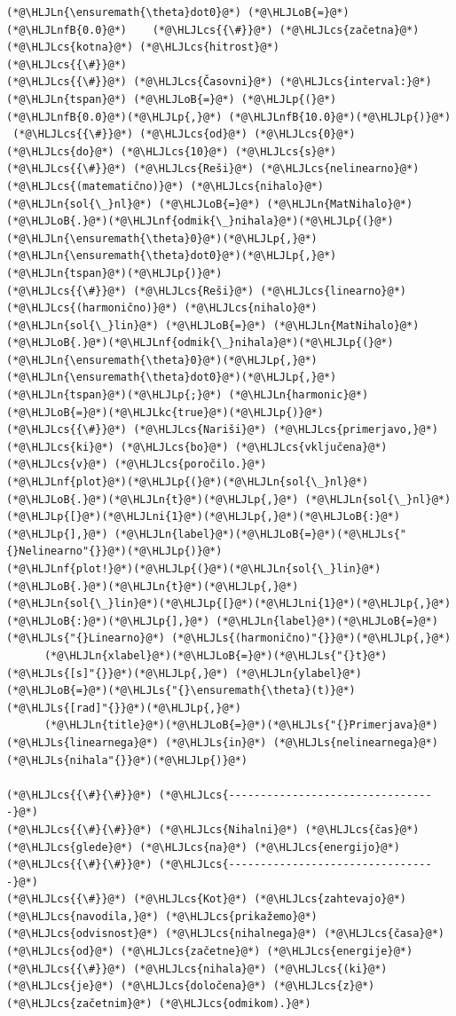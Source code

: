 \documentclass[12pt,a4paper]{article}
\newcommand{\HLJLkc}[1]{\textcolor[RGB]{59,151,46}{\textit{#1}}}
\newcommand{\HLJLn}[1]{#1}
\newcommand{\HLJLnf}[1]{\textcolor[RGB]{66,102,213}{#1}}
\newcommand{\HLJLs}[1]{\textcolor[RGB]{201,61,57}{#1}}
\newcommand{\HLJLnfB}[1]{\textcolor[RGB]{59,151,46}{#1}}
\newcommand{\HLJLni}[1]{\textcolor[RGB]{59,151,46}{#1}}
\newcommand{\HLJLoB}[1]{\textcolor[RGB]{102,102,102}{\textbf{#1}}}
\newcommand{\HLJLp}[1]{#1}
\newcommand{\HLJLcs}[1]{\textcolor[RGB]{153,153,119}{\textit{#1}}}
\begin{document}
\begin{lstlisting}
(*@\HLJLn{\ensuremath{\theta}dot0}@*) (*@\HLJLoB{=}@*) (*@\HLJLnfB{0.0}@*)    (*@\HLJLcs{{\#}}@*) (*@\HLJLcs{začetna}@*) (*@\HLJLcs{kotna}@*) (*@\HLJLcs{hitrost}@*)
(*@\HLJLcs{{\#}}@*)
(*@\HLJLcs{{\#}}@*) (*@\HLJLcs{Časovni}@*) (*@\HLJLcs{interval:}@*)
(*@\HLJLn{tspan}@*) (*@\HLJLoB{=}@*) (*@\HLJLp{(}@*)(*@\HLJLnfB{0.0}@*)(*@\HLJLp{,}@*) (*@\HLJLnfB{10.0}@*)(*@\HLJLp{)}@*)  (*@\HLJLcs{{\#}}@*) (*@\HLJLcs{od}@*) (*@\HLJLcs{0}@*) (*@\HLJLcs{do}@*) (*@\HLJLcs{10}@*) (*@\HLJLcs{s}@*)
(*@\HLJLcs{{\#}}@*) (*@\HLJLcs{Reši}@*) (*@\HLJLcs{nelinearno}@*) (*@\HLJLcs{(matematično)}@*) (*@\HLJLcs{nihalo}@*)
(*@\HLJLn{sol{\_}nl}@*) (*@\HLJLoB{=}@*) (*@\HLJLn{MatNihalo}@*)(*@\HLJLoB{.}@*)(*@\HLJLnf{odmik{\_}nihala}@*)(*@\HLJLp{(}@*)(*@\HLJLn{\ensuremath{\theta}0}@*)(*@\HLJLp{,}@*) (*@\HLJLn{\ensuremath{\theta}dot0}@*)(*@\HLJLp{,}@*) (*@\HLJLn{tspan}@*)(*@\HLJLp{)}@*)
(*@\HLJLcs{{\#}}@*) (*@\HLJLcs{Reši}@*) (*@\HLJLcs{linearno}@*) (*@\HLJLcs{(harmonično)}@*) (*@\HLJLcs{nihalo}@*)
(*@\HLJLn{sol{\_}lin}@*) (*@\HLJLoB{=}@*) (*@\HLJLn{MatNihalo}@*)(*@\HLJLoB{.}@*)(*@\HLJLnf{odmik{\_}nihala}@*)(*@\HLJLp{(}@*)(*@\HLJLn{\ensuremath{\theta}0}@*)(*@\HLJLp{,}@*) (*@\HLJLn{\ensuremath{\theta}dot0}@*)(*@\HLJLp{,}@*) (*@\HLJLn{tspan}@*)(*@\HLJLp{;}@*) (*@\HLJLn{harmonic}@*)(*@\HLJLoB{=}@*)(*@\HLJLkc{true}@*)(*@\HLJLp{)}@*)
(*@\HLJLcs{{\#}}@*) (*@\HLJLcs{Nariši}@*) (*@\HLJLcs{primerjavo,}@*) (*@\HLJLcs{ki}@*) (*@\HLJLcs{bo}@*) (*@\HLJLcs{vključena}@*) (*@\HLJLcs{v}@*) (*@\HLJLcs{poročilo.}@*)
(*@\HLJLnf{plot}@*)(*@\HLJLp{(}@*)(*@\HLJLn{sol{\_}nl}@*)(*@\HLJLoB{.}@*)(*@\HLJLn{t}@*)(*@\HLJLp{,}@*) (*@\HLJLn{sol{\_}nl}@*)(*@\HLJLp{[}@*)(*@\HLJLni{1}@*)(*@\HLJLp{,}@*)(*@\HLJLoB{:}@*)(*@\HLJLp{],}@*) (*@\HLJLn{label}@*)(*@\HLJLoB{=}@*)(*@\HLJLs{"{}Nelinearno"{}}@*)(*@\HLJLp{)}@*)
(*@\HLJLnf{plot!}@*)(*@\HLJLp{(}@*)(*@\HLJLn{sol{\_}lin}@*)(*@\HLJLoB{.}@*)(*@\HLJLn{t}@*)(*@\HLJLp{,}@*) (*@\HLJLn{sol{\_}lin}@*)(*@\HLJLp{[}@*)(*@\HLJLni{1}@*)(*@\HLJLp{,}@*)(*@\HLJLoB{:}@*)(*@\HLJLp{],}@*) (*@\HLJLn{label}@*)(*@\HLJLoB{=}@*)(*@\HLJLs{"{}Linearno}@*) (*@\HLJLs{(harmonično)"{}}@*)(*@\HLJLp{,}@*)
      (*@\HLJLn{xlabel}@*)(*@\HLJLoB{=}@*)(*@\HLJLs{"{}t}@*) (*@\HLJLs{[s]"{}}@*)(*@\HLJLp{,}@*) (*@\HLJLn{ylabel}@*)(*@\HLJLoB{=}@*)(*@\HLJLs{"{}\ensuremath{\theta}(t)}@*) (*@\HLJLs{[rad]"{}}@*)(*@\HLJLp{,}@*)
      (*@\HLJLn{title}@*)(*@\HLJLoB{=}@*)(*@\HLJLs{"{}Primerjava}@*) (*@\HLJLs{linearnega}@*) (*@\HLJLs{in}@*) (*@\HLJLs{nelinearnega}@*) (*@\HLJLs{nihala"{}}@*)(*@\HLJLp{)}@*)

(*@\HLJLcs{{\#}{\#}}@*) (*@\HLJLcs{---------------------------------}@*)
(*@\HLJLcs{{\#}{\#}}@*) (*@\HLJLcs{Nihalni}@*) (*@\HLJLcs{čas}@*) (*@\HLJLcs{glede}@*) (*@\HLJLcs{na}@*) (*@\HLJLcs{energijo}@*)
(*@\HLJLcs{{\#}{\#}}@*) (*@\HLJLcs{---------------------------------}@*)
(*@\HLJLcs{{\#}}@*) (*@\HLJLcs{Kot}@*) (*@\HLJLcs{zahtevajo}@*) (*@\HLJLcs{navodila,}@*) (*@\HLJLcs{prikažemo}@*) (*@\HLJLcs{odvisnost}@*) (*@\HLJLcs{nihalnega}@*) (*@\HLJLcs{časa}@*) (*@\HLJLcs{od}@*) (*@\HLJLcs{začetne}@*) (*@\HLJLcs{energije}@*)
(*@\HLJLcs{{\#}}@*) (*@\HLJLcs{nihala}@*) (*@\HLJLcs{(ki}@*) (*@\HLJLcs{je}@*) (*@\HLJLcs{določena}@*) (*@\HLJLcs{z}@*) (*@\HLJLcs{začetnim}@*) (*@\HLJLcs{odmikom).}@*)


\end{lstlisting}
\end{document}
